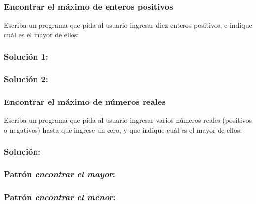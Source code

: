 \documentclass[12pt]{beamer}
\begin{document}
  \begin{frame}
    \frametitle{Encontrar el máximo de enteros positivos}
    Escriba un programa que pida al usuario
    ingresar diez enteros positivos,
    e indique cuál es el mayor de ellos:
    
  \end{frame}

  \begin{frame}
    \frametitle{Solución 1:}
    
  \end{frame}

  \begin{frame}
    \frametitle{Solución 2:}
    
  \end{frame}

  \begin{frame}
    \frametitle{Encontrar el máximo de números reales}
    Escriba un programa que pida al usuario
    ingresar varios números reales (positivos o negativos)
    hasta que ingrese un cero,
    y que indique cuál es el mayor de ellos:
    
  \end{frame}

  \begin{frame}
    \frametitle{Solución:}
    
  \end{frame}

  \begin{frame}
    \frametitle{Patrón \emph{encontrar el mayor}:}
    
  \end{frame}

  \begin{frame}
    \frametitle{Patrón \emph{encontrar el menor}:}
    
  \end{frame}
\end{document}
